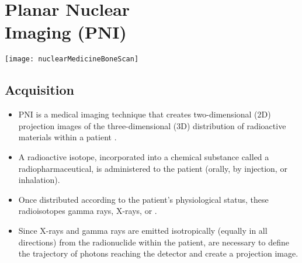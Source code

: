 \chapter[\gls{PNI}]{Planar Nuclear\\Imaging (PNI)}
\vspace{-51ex}
\begin{flushright}
\texttt{[image: nuclearMedicineBoneScan]} %
\end{flushright}


\section{Acquisition}
\begin{itemize}
\item \gls{PNI} is a medical imaging technique that
  creates two-dimensional (2D) projection images of the
  three-dimensional (3D) distribution of radioactive materials within
  a patient \cite{bushberg2011essential}.
\item A radioactive isotope, incorporated into a chemical substance
  called a radiopharmaceutical, is administered to the patient
  (orally, by injection, or inhalation).
\item Once distributed according to the patient's physiological
  status, these radioisotopes 
  gamma rays, X-rays, or .
\item Since X-rays and gamma rays are emitted isotropically (equally
  in all directions) from the radionuclide within the patient,
   are necessary to define the trajectory of photons
  reaching the detector and create a projection image.
\end{itemize}

